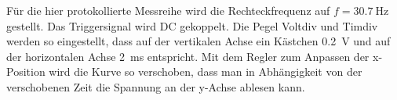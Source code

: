 \noindent
Für die hier protokollierte Messreihe wird die Rechteckfrequenz auf $f = \qty{30.7}{\hertz}$ gestellt.
Das Triggersignal wird DC gekoppelt.
Die Pegel Voltdiv und Timdiv werden so eingestellt, 
dass auf der vertikalen Achse ein Kästchen \qty[]{0.2}{\volt} und auf der horizontalen Achse \qty{2}{\ms} entspricht.
Mit dem Regler zum Anpassen der x-Position wird die Kurve so verschoben, 
dass man in Abhängigkeit von der verschobenen Zeit die Spannung an der y-Achse ablesen kann.